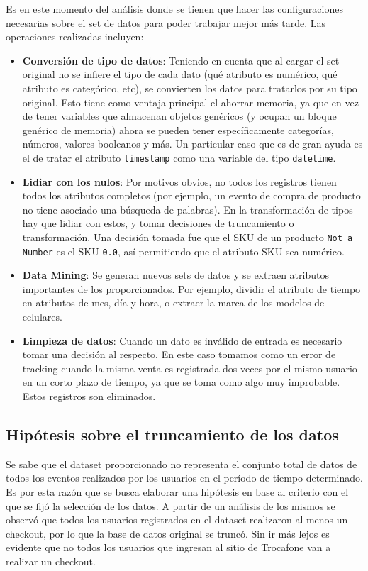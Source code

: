 \documentclass[a4paper]{article}
\begin{document}
Es en este momento del análisis donde se tienen que hacer las configuraciones necesarias sobre el set de datos para poder trabajar mejor más tarde. Las operaciones realizadas incluyen:

\begin{itemize}
\item \textbf{Conversión de tipo de datos}: Teniendo en cuenta que al cargar el set original no se infiere el tipo de cada dato (qué atributo es numérico, qué atributo es categórico, etc), se convierten los datos para tratarlos por su tipo original. Esto tiene como ventaja principal el ahorrar memoria, ya que en vez de tener variables que almacenan objetos genéricos (y ocupan un bloque genérico de memoria) ahora se pueden tener específicamente categorías, números, valores booleanos y más. Un particular caso que es de gran ayuda es el de tratar el atributo \texttt{timestamp} como una variable del tipo \texttt{datetime}.
\item \textbf{Lidiar con los nulos}: Por motivos obvios, no todos los registros tienen todos los atributos completos (por ejemplo, un evento de compra de producto no tiene asociado una búsqueda de palabras). En la transformación de tipos hay que lidiar con estos, y tomar decisiones de truncamiento o transformación. Una decisión tomada fue que el SKU de un producto \texttt{Not a Number} es el SKU \texttt{0.0}, así permitiendo que el atributo SKU sea numérico.
\item \textbf{Data Mining}: Se generan nuevos sets de datos y se extraen atributos importantes de los proporcionados. Por ejemplo, dividir el atributo de tiempo en atributos de mes, día y hora, o extraer la marca de los modelos de celulares.
\item \textbf{Limpieza de datos}: Cuando un dato es inválido de entrada es necesario tomar una decisión al respecto. En este caso tomamos como un error de tracking cuando la misma venta es registrada dos veces por el mismo usuario en un corto plazo de tiempo, ya que se toma como algo muy improbable. Estos registros son eliminados.
\end{itemize}

\subsection{Hipótesis sobre el truncamiento de los datos}

Se sabe que el dataset proporcionado no representa el conjunto total de datos de todos los eventos realizados por los usuarios en el período de tiempo determinado. Es por esta razón que se busca elaborar una hipótesis en base al criterio con el que se fijó la selección de los datos. A partir de un análisis de los mismos se observó que todos los usuarios registrados en el dataset realizaron al menos un checkout, por lo que la base de datos original se truncó. Sin ir más lejos es evidente que no todos los usuarios que ingresan al sitio de Trocafone van a realizar un checkout.
\end{document}
